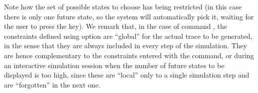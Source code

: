 Note how the set of possible states to choose has being restricted (in this case
there is only one future state, so the system will automatically
pick it, waiting for the user to press the \ret key).
We remark that, in the case of command , the constraints
defined using option  are ``global'' for the actual trace to be
generated, in the sense that they are always included in every step of
the simulation. They are hence complementary to the constraints entered
with the  command, or during an interactive
simulation session when the number of future states to be displayed is
too high, since these are ``local'' only to a single simulation step and
are ``forgotten'' in the next one.
